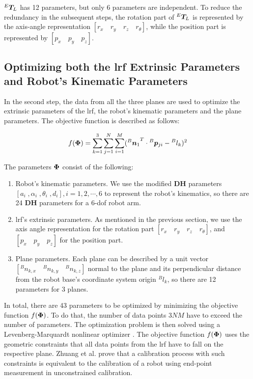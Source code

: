 ${^E}\vb*{T}_L$ has 12 parameters, but only 6 parameters are independent. To reduce the redundancy in the subsequent steps, the rotation part of ${^E}\vb*{T}_L$ is represented by the axis-angle representation $[r_x \quad r_y \quad r_z \quad r_{\theta}]$, while the position part is represented by  $[p_x \quad p_y\quad p_z]$.


\subsection{Optimizing both the \ac{lrf} Extrinsic Parameters and Robot's Kinematic Parameters}
\label{sec:second_step}
In the second step, the data from all the three planes are used to optimize the extrinsic parameters of the \ac{lrf}, the robot's kinematic parameters and the plane parameters. The objective function is described as follows:

\begin{equation}
 f (\vb*{\Phi}) =  \sum_{k=1}^{3} \sum_{j=1}^{N} \sum_{i=1}^{M} ({{^B}\vb*{n}_1}^T \cdot {^B}\vb*{p}_{ji} - {^B}l_k)^2
\end{equation}

The parameters $\vb*{\Phi}$ consist of the following:
\begin{enumerate}
\item Robot's kinematic parameters. We use the modified \textbf{DH} parameters \cite{Hayati1985} $[a_i \;, \alpha_i \;,\theta_i \;,d_i], i=1, 2, \cdots ,6$ to represent the robot's kinematics, so there are 24 \textbf{DH} parameters for a 6-\ac{dof} robot arm. 
\item \ac{lrf}'s extrinsic parameters. As mentioned in the previous section, we use the axis angle representation for the rotation part $[r_x \quad r_y \quad r_z \quad r_{\theta}]$, and $[p_x \quad p_y\quad p_z]$ for the position part. 
\item Plane parameters. Each plane can be described by a unit vector $[{^B}n_{k,x}\quad {^B}n_{k,y}\quad {^B}n_{k,z}]$ normal to the plane and its perpendicular distance from the robot base's coordinate system origin ${^B}l_{k}$, so there are 12 parameters for 3 planes.
\end{enumerate}

In total, there are 43 parameters to be optimized by minimizing the objective function $f(\vb*{\Phi})$. To do that, the number of data points $3NM$ have to exceed the number of parameters. The optimization problem is then solved using a Levenberg-Marquardt nonlinear optimizer \cite{Newville2014}. The objective function $f(\vb*{\Phi})$ uses the geometric constraints that all data points from the \ac{lrf} have to fall on the respective plane. Zhuang et al. \cite{Zhuang1999} prove that a calibration process with such constraints is equivalent to the calibration of a robot using end-point measurement in unconstrained calibration. 

